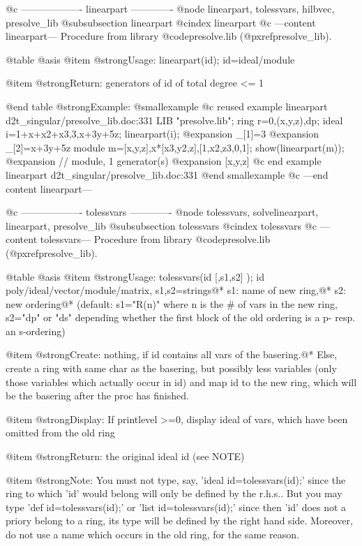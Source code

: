 @c ------------------- linearpart -------------
@node linearpart, tolessvars, hilbvec, presolve_lib
@subsubsection linearpart
@cindex linearpart
@c ---content linearpart---
Procedure from library @code{presolve.lib} (@pxref{presolve_lib}).

@table @asis
@item @strong{Usage:}
linearpart(id); id=ideal/module

@item @strong{Return:}
generators of id of total degree <= 1

@end table
@strong{Example:}
@smallexample
@c reused example linearpart d2t_singular/presolve_lib.doc:331 
LIB "presolve.lib";
ring r=0,(x,y,z),dp;
ideal i=1+x+x2+x3,3,x+3y+5z;
linearpart(i);
@expansion{} _[1]=3
@expansion{} _[2]=x+3y+5z
module m=[x,y,z],x*[x3,y2,z],[1,x2,z3,0,1];
show(linearpart(m));
@expansion{} // module, 1 generator(s)
@expansion{} [x,y,z]
@c end example linearpart d2t_singular/presolve_lib.doc:331
@end smallexample
@c ---end content linearpart---

@c ------------------- tolessvars -------------
@node tolessvars, solvelinearpart, linearpart, presolve_lib
@subsubsection tolessvars
@cindex tolessvars
@c ---content tolessvars---
Procedure from library @code{presolve.lib} (@pxref{presolve_lib}).

@table @asis
@item @strong{Usage:}
tolessvars(id [,s1,s2] ); id poly/ideal/vector/module/matrix,
s1,s2=strings@*
s1: name of new ring,@*
s2: new ordering@*
(default: s1="R(n)" where n is the # of vars in the new ring,
s2="dp" or "ds" depending whether the first block of the old
ordering is a p- resp. an s-ordering)

@item @strong{Create:}
nothing, if id contains all vars of the basering.@*
Else, create a ring with same char as the basering, but possibly less
variables (only those variables which actually occur in id) and map
id to the new ring, which will be the basering after the proc has
finished.

@item @strong{Display:}
If printlevel >=0, display ideal of vars, which have been omitted from
the old ring

@item @strong{Return:}
the original ideal id (see NOTE)

@item @strong{Note:}
You must not type, say, 'ideal id=tolessvars(id);' since the ring
to which 'id' would belong will only be defined by the r.h.s.. But you
may type 'def id=tolessvars(id);' or 'list id=tolessvars(id);'
since then 'id' does not a priory belong to a ring, its type will
be defined by the right hand side. Moreover, do not use a name which
occurs in the old ring, for the same reason.

